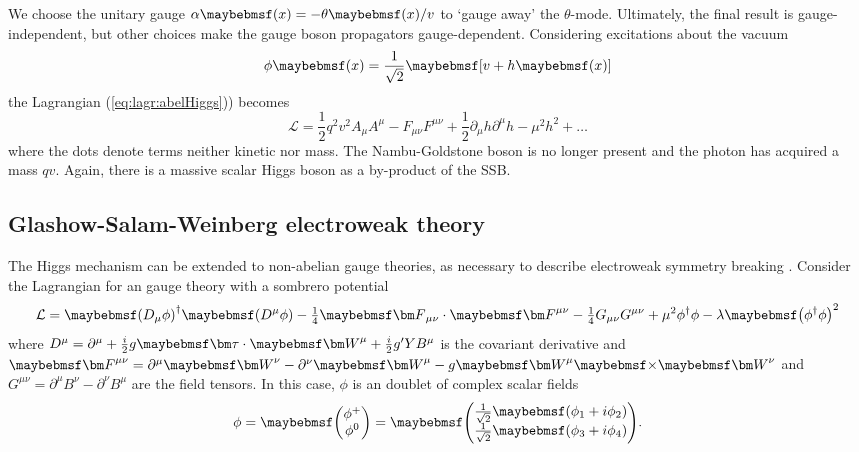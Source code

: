 We choose the unitary gauge $\alpha\parenths{x} = -\theta\parenths{x}/v$ to `gauge away' 
the $\theta$-mode. Ultimately, the final result is gauge-independent, but other choices 
make the gauge boson propagators gauge-dependent. Considering excitations about the vacuum
\begin{equation}
	\phi\parenths{x} = \frac{1}{\sqrt{2}} \sqbracs{v + h\parenths{x}}
\end{equation}
the Lagrangian (\ref{eq:lagr:abelHiggs})) becomes
\begin{equation}
	\mathcal{L}
	= \frac{1}{2} q^2 v^2 A_{\mu} A^{\mu}
	- F_{\mu\nu}F^{\mu\nu}
	+ \frac{1}{2} \partial_{\mu}h \partial^{\mu}h
	- \mu^2 h^2
	+ \dots
\end{equation}
where the dots denote terms neither kinetic nor mass. 
The Nambu-Goldstone boson is no longer present and the photon has acquired a mass $qv$.
Again, there is a massive scalar Higgs boson as a by-product of the \ac{SSB}.


\subsection{Glashow-Salam-Weinberg electroweak theory}
The Higgs mechanism can be extended to non-abelian gauge theories, as necessary to 
describe electroweak symmetry breaking \cite{Kibble:1967,Weinberg:1967,Salam:1968}.
Consider the Lagrangian for an \cross{} gauge theory with a sombrero
potential
\begin{equation}
	\mathcal{L} 
	= \parenths{D_{\mu}\phi}^{\dagger} \parenths{D^{\mu}\phi}
	- \tfrac{1}{4} \bvec{F}_{\mu\nu} \cdot \bvec{F}^{\mu\nu}
	- \tfrac{1}{4} G_{\mu\nu} G^{\mu\nu}
	+ \mu^2 \phi^{\dagger} \phi - \lambda \parenths{\phi^{\dagger} \phi}^2
	\label{eq:lagr:ewHiggs}
\end{equation}
where $D^{\mu} = \partial^{\mu} + \tfrac{i}{2} g \bvec{\tau} \cdot \bvec{W}^{\mu} + 
\tfrac{i}{2} g' Y B^{\mu}$ is the covariant derivative and $\bvec{F}^{\mu\nu} = 
\partial^{\mu}\bvec{W}^{\nu} - \partial^{\nu}\bvec{W}^{\mu} - g \bvec{W}^{\mu} \cross 
\bvec{W}^{\nu}$ and $G^{\mu\nu} = \partial^{\mu}B^{\nu} - \partial^{\nu}B^{\mu}$ are the
field tensors. In this case, $\phi$ is an  doublet of complex scalar fields
\begin{equation}
	\phi = \colvector{\phi^+\\\phi^0} = \colvector{\frac{1}{\sqrt{2}} \parenths{\phi_1 + i\phi_2}\\ \frac{1}{\sqrt{2}} \parenths{\phi_3 + i\phi_4}}.
\end{equation}

